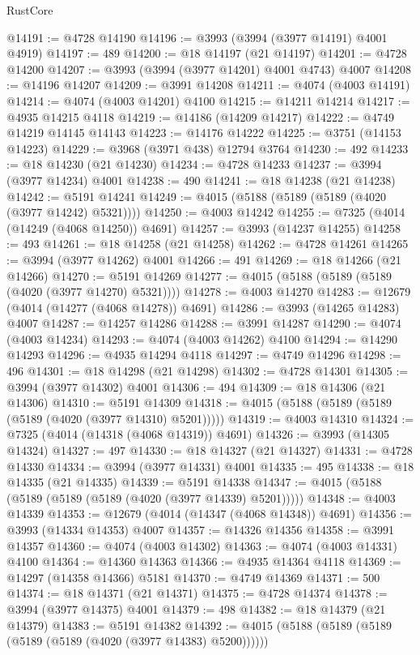 \begin{lexlean}{RustCore}
\begin{coremodule}
@14191 := @4728 @14190
@14196 := @3993 (@3994 (@3977 @14191) @4001 @4919)
@14197 := 489
@14200 := @18 @14197 (@21 @14197)
@14201 := @4728 @14200
@14207 := @3993 (@3994 (@3977 @14201) @4001 @4743) @4007
@14208 := @14196 @14207
@14209 := @3991 @14208
@14211 := @4074 (@4003 @14191)
@14214 := @4074 (@4003 @14201) @4100
@14215 := @14211 @14214
@14217 := @4935 @14215 @4118
@14219 := @14186 (@14209 @14217)
@14222 := @4749 @14219 @14145 @14143
@14223 := @14176 @14222
@14225 := @3751 (@14153 @14223)
@14229 := @3968 (@3971 @438) @12794 @3764
@14230 := 492
@14233 := @18 @14230 (@21 @14230)
@14234 := @4728 @14233
@14237 := @3994 (@3977 @14234) @4001
@14238 := 490
@14241 := @18 @14238 (@21 @14238)
@14242 := @5191 @14241
@14249 := @4015 (@5188 (@5189 (@5189 (@4020 (@3977 @14242) @5321))))
@14250 := @4003 @14242
@14255 := @7325 (@4014 (@14249 (@4068 @14250)) @4691)
@14257 := @3993 (@14237 @14255)
@14258 := 493
@14261 := @18 @14258 (@21 @14258)
@14262 := @4728 @14261
@14265 := @3994 (@3977 @14262) @4001
@14266 := 491
@14269 := @18 @14266 (@21 @14266)
@14270 := @5191 @14269
@14277 := @4015 (@5188 (@5189 (@5189 (@4020 (@3977 @14270) @5321))))
@14278 := @4003 @14270
@14283 := @12679 (@4014 (@14277 (@4068 @14278)) @4691)
@14286 := @3993 (@14265 @14283) @4007
@14287 := @14257 @14286
@14288 := @3991 @14287
@14290 := @4074 (@4003 @14234)
@14293 := @4074 (@4003 @14262) @4100
@14294 := @14290 @14293
@14296 := @4935 @14294 @4118
@14297 := @4749 @14296
@14298 := 496
@14301 := @18 @14298 (@21 @14298)
@14302 := @4728 @14301
@14305 := @3994 (@3977 @14302) @4001
@14306 := 494
@14309 := @18 @14306 (@21 @14306)
@14310 := @5191 @14309
@14318 := @4015 (@5188 (@5189 (@5189 (@5189 (@4020 (@3977 @14310) @5201)))))
@14319 := @4003 @14310
@14324 := @7325 (@4014 (@14318 (@4068 @14319)) @4691)
@14326 := @3993 (@14305 @14324)
@14327 := 497
@14330 := @18 @14327 (@21 @14327)
@14331 := @4728 @14330
@14334 := @3994 (@3977 @14331) @4001
@14335 := 495
@14338 := @18 @14335 (@21 @14335)
@14339 := @5191 @14338
@14347 := @4015 (@5188 (@5189 (@5189 (@5189 (@4020 (@3977 @14339) @5201)))))
@14348 := @4003 @14339
@14353 := @12679 (@4014 (@14347 (@4068 @14348)) @4691)
@14356 := @3993 (@14334 @14353) @4007
@14357 := @14326 @14356
@14358 := @3991 @14357
@14360 := @4074 (@4003 @14302)
@14363 := @4074 (@4003 @14331) @4100
@14364 := @14360 @14363
@14366 := @4935 @14364 @4118
@14369 := @14297 (@14358 @14366) @5181
@14370 := @4749 @14369
@14371 := 500
@14374 := @18 @14371 (@21 @14371)
@14375 := @4728 @14374
@14378 := @3994 (@3977 @14375) @4001
@14379 := 498
@14382 := @18 @14379 (@21 @14379)
@14383 := @5191 @14382
@14392 := @4015 (@5188 (@5189 (@5189 (@5189 (@5189 (@4020 (@3977 @14383) @5200))))))

\end{coremodule}
\end{lexlean}
